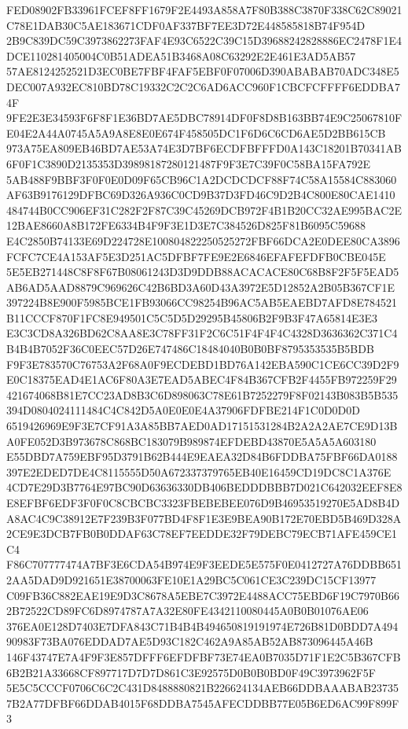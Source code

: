 \documentclass[UTF8,fontset=fandol,zihao=-4,a4paper]{ctexart}
\begin{document}
{{FED08902FB33961FCEF8FF1679F2E4493A858A7F80B388C3870F338C62C89021C78E1DAB30C5AE183671CDF0AF337BF7EE3D72E448585818B74F954D
2B9C839DC59C3973862273FAF4E93C6522C39C15D39688242828886EC2478F1E4DCE110281405004C0B51ADEA51B3468A08C63292E2E461E3AD5AB57
57AE8124252521D3EC0BE7FBF4FAF5EBF0F07006D390ABABAB70ADC348E5DEC007A932EC810BD78C19332C2C2C6AD6ACC960F1CBCFCFFFF6EDDBA74F
9FE2E3E34593F6F8F1E36BD7AE5DBC78914DF0F8D8B163BB74E9C25067810FE04E2A44A0745A5A9A8E8E0E674F458505DC1F6D6C6CD6AE5D2BB615CB
973A75EA809EB46BD7AE53A74E3D7BF6ECDFBFFFD0A143C18201B70341AB6F0F1C3890D2135353D39898187280121487F9F3E7C39F0C58BA15FA792E
5AB488F9BBF3F0F0E0D09F65CB96C1A2DCDCDCF88F74C58A15584C883060AF63B9176129DFBC69D326A936C0CD9B37D3FD46C9D2B4C800E80CAE1410
484744B0CC906EF31C282F2F87C39C45269DCB972F4B1B20CC32AE995BAC2E12BAE8660A8B172FE6334B4F9F3E1D3E7C384526D825F81B6095C59688
E4C2850B74133E69D224728E100804822250525272FBF66DCA2E0DEE80CA3896FCFC7CE4A153AF5E3D251AC5DFBF7FE9E2E6846EFAFEFDFB0CBE045E
5E5EB271448C8F8F67B08061243D3D9DDB88ACACACE80C68B8F2F5F5EAD5AB6AD5AAD8879C969626C42B6BD3A60D43A3972E5D12852A2B05B367CF1E
397224B8E900F5985BCE1FB93066CC98254B96AC5AB5EAEBD7AFD8E784521B11CCCF870F1FC8E949501C5C5D5D29295B45806B2F9B3F47A65814E3E3
E3C3CD8A326BD62C8AA8E3C78FF31F2C6C51F4F4F4C4328D3636362C371C4B4B4B7052F36C0EEC57D26E747486C18484040B0B0BF8795353535B5BDB
F9F3E783570C76753A2F68A0F9ECDEBD1BD76A142EBA590C1CE6CC39D2F9E0C18375EAD4E1AC6F80A3E7EAD5ABEC4F84B367CFB2F4455FB972259F29
421674068B81E7CC23AD8B3C6D898063C78E61B7252279F8F02143B083B5B535394D0804024111484C4C842D5A0E0E0E4A37906FDFBE214F1C0D0D0D
6519426969E9F3E7CF91A3A85BB7AED0AD17151531284B2A2A2AE7CE9D13BA0FE052D3B973678C868BC183079B989874EFDEBD43870E5A5A5A603180
E55DBD7A759EBF95D3791B62B444E9EAEA32D84B6FDDBA75FBF66DA0188397E2EDED7DE4C8115555D50A672337379765EB40E16459CD19DC8C1A376E
4CD7E29D3B7764E97BC90D63636330DB406BEDDDBBB7D021C642032EEF8E8E8EFBF6EDF3F0F0C8CBCBC3323FBEBEBEE076D9B46953519270E5AD8B4D
A8AC4C9C38912E7F239B3F077BD4F8F1E3E9BEA90B172E70EBD5B469D328A2CE9E3DCB7FB0B0DDAF63C78EF7EEDDE32F79DEBC79ECB71AFE459CE1C4
F86C707777474A7BF3E6CDA54B974E9F3EEDE5E575F0E0412727A76DDBB6512AA5DAD9D921651E38700063FE10E1A29BC5C061CE3C239DC15CF13977
C09FB36C882EAE19E9D3C8678A5EBE7C3972E4488ACC75EBD6F19C7970B662B72522CD89FC6D8974787A7A32E80FE4342110080445A0B0B01076AE06
376EA0E128D7403E7DFA843C71B4B4B494650819191974E726B81D0BDD7A49490983F73BA076EDDAD7AE5D93C182C462A9A85AB52AB873096445A46B
146F43747E7A4F9F3E857DFFF6EFDFBF73E74EA0B7035D71F1E2C5B367CFB6B2B21A33668CF897717D7D7D861C3E92575D0B0B0BD0F49C3973962F5F
5E5C5CCCF0706C6C2C431D8488880821B226624134AEB66DDBAAABAB237357B2A77DFBF66DDAB4015F68DDBA7545AFECDDBB77E05B6ED6AC99F899F3
}}
\end{document}
